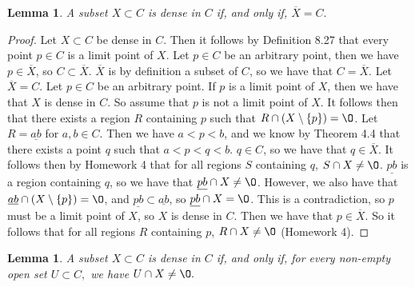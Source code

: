 \documentclass[12pt]{article}
\renewcommand{\emptyset}{\O}
\renewcommand{\_}[1]{\underline{ #1 }}
\newtheorem{lemma}[theorem]{Lemma}
\theoremstyle{definition}
\numberwithin{equation}{subsection}
\begin{document}
\begin{lemma} A subset $X\subset C$ is dense in $C$ if, and only if, $\overline{X}=C.$
\end{lemma}

\begin{proof}
Let $X \subset C$ be dense in $C$. Then it follows by Definition 8.27 that every point $p \in C$ is a limit point of $X$. Let $p \in C$ be an arbitrary point, then we have $p \in \overline{X}$, so $C \subset \overline{X}$. $\overline{X}$ is by definition a subset of $C$, so we have that $C = \overline{X}$. \newline
Let $\overline{X} = C$. Let $p \in C$ be an arbitrary point. If $p$ is a limit point of $X$, then we have that $X$ is dense in $C$. So assume that $p$ is not a limit point of $X$. It follows then that there exists a region $R$ containing $p$ such that $R \cap (X \setminus\{p\}) = \emptyset$. Let $R = \_{ab}$ for $a,b \in C$. Then we have $a < p < b$, and we know by Theorem 4.4 that there exists a point $q$ such that $a < p < q < b$. $q \in C$, so we have that $q \in \overline{X}$. It follows then by Homework 4 that for all regions $S$ containing $q$, $S \cap X \not = \emptyset$. $\_{pb}$ is a region containing $q$, so we have that $\_{pb} \cap X \not = \emptyset$. However, we also have that $\_{ab} \cap (X \setminus\{p\}) = \emptyset$, and $\_{pb} \subset \_{ab}$, so $\_{pb} \cap X = \emptyset$. This is a contradiction, so $p$ must be a limit point of $X$, so $X$ is dense in $C$.
Then we have that $p \in \overline{X}$. So it follows that for all regions $R$ containing $p$, $R \cap X \not = \emptyset$ (Homework 4). 
 \end{proof}

\begin{lemma} A subset $X\subset C$ is dense in $C$ if, and only if, for every non-empty open set $U\subset C,$ we have $U\cap X\neq \emptyset.$ 
\end{lemma}
\end{document}
